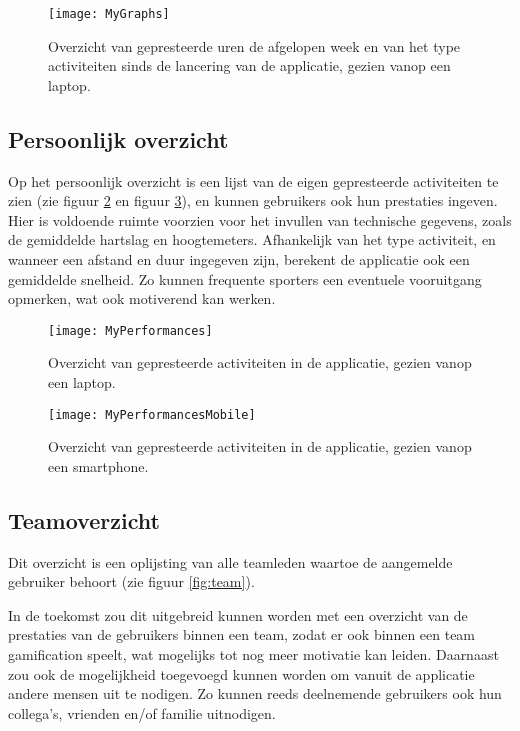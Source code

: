 \begin{figure}[h]
    \caption[Overzicht prestaties dashboard website]{Overzicht van gepresteerde uren de afgelopen week en van het type activiteiten sinds de lancering van de applicatie, gezien vanop een laptop.}
    \texttt{[image: MyGraphs]}
    \label{fig:graphs}
\end{figure}

\subsection{Persoonlijk overzicht}
Op het persoonlijk overzicht is een lijst van de eigen gepresteerde activiteiten te zien (zie figuur \ref{fig:performances} en figuur \ref{fig:performancesMobile}), en kunnen gebruikers ook hun prestaties ingeven. Hier is voldoende ruimte voorzien voor het invullen van technische gegevens, zoals de gemiddelde hartslag en hoogtemeters. Afhankelijk van het type activiteit, en wanneer een afstand en duur ingegeven zijn, berekent de applicatie ook een gemiddelde snelheid. Zo kunnen frequente sporters een eventuele vooruitgang opmerken, wat ook motiverend kan werken.

\begin{figure}[h]
    \caption[Overzicht activiteiten website]{Overzicht van gepresteerde activiteiten in de applicatie, gezien vanop een laptop.}
    \texttt{[image: MyPerformances]}
    \label{fig:performances}
\end{figure}

\begin{figure}[h]
    \caption[Overzicht activiteiten website smartphone]{Overzicht van gepresteerde activiteiten in de applicatie, gezien vanop een smartphone.}
    \texttt{[image: MyPerformancesMobile]}
    \label{fig:performancesMobile}
\end{figure}

\subsection{Teamoverzicht}

Dit overzicht is een oplijsting van alle teamleden waartoe de aangemelde gebruiker behoort (zie figuur \ref{fig:team}).

In de toekomst zou dit uitgebreid kunnen worden met een overzicht van de prestaties van de gebruikers binnen een team, zodat er ook binnen een team gamification speelt, wat mogelijks tot nog meer motivatie kan leiden.
Daarnaast zou ook de mogelijkheid toegevoegd kunnen worden om vanuit de applicatie andere mensen uit te nodigen. Zo kunnen reeds deelnemende gebruikers ook hun collega's, vrienden en/of familie uitnodigen.

